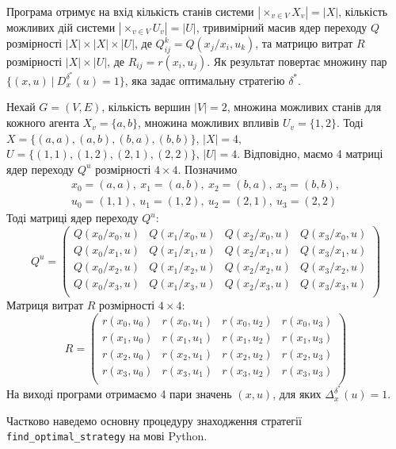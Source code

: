 \documentclass[oneside,14pt]{extarticle}
\begin{document}
Програма отримує на вхід кількість станів системи \(|\times_{v \in V} X_v| = |X|\), кількість можливих дій системи \(|\times_{v \in V}U_v| = |U|\),  тривимірний масив ядер переходу \(Q\) розмірності \(|X| \times |X| \times |U| \), де \(Q_{ij}^k = Q(x_j/x_i, u_k)\), та матрицю витрат \(R\) розмірності \(|X| \times |U|\), де \(R_{ij} = r(x_i, u_j)\). Як результат повертає множину пар \(\{(x, u)\ |\ D_x^{\delta^*}(u) = 1\}\), яка задає оптимальну стратегію \(\delta^*\).

\begin{example}
Нехай \(G = (V, E)\), кількість вершин \(|V| = 2\), множина можливих станів для кожного агента \(X_v = \{a, b\}\), множина можливих впливів \(U_v = \{1, 2\}\). Тоді \(X = \{(a, a), (a, b), (b, a), (b, b)\}\), \(|X| = 4\), \(U = \{(1, 1), (1, 2), (2, 1), (2, 2)\}\), \(|U| = 4\). Відповідно, маємо 4 матриці ядер переходу \(Q^u\) розмірності \(4 \times 4\). Позначимо
\begin{gather*}
x_0 = (a, a),\ x_1 = (a, b),\ x_2 = (b, a),\ x_3 = (b, b), \\
u_0 = (1, 1),\ u_1 = (1, 2),\ u_2 = (2, 1),\ u_3 = (2, 2)
\end{gather*}
Тоді матриці ядер переходу \(Q^u\):
\[Q^{u} = \left(\begin{matrix}
Q(x_0 / x_0, u) & Q(x_1 / x_0, u) & Q(x_2 / x_0, u) & Q(x_3 / x_0, u) \\
Q(x_0 / x_1, u) & Q(x_1 / x_1, u) & Q(x_2 / x_1, u) & Q(x_3 / x_1, u) \\
Q(x_0 / x_2, u) & Q(x_1 / x_2, u) & Q(x_2 / x_2, u) & Q(x_3 / x_2, u) \\
Q(x_0 / x_3, u) & Q(x_1 / x_3, u) & Q(x_2 / x_3, u) & Q(x_3 / x_3, u) \\
\end{matrix}\right)\]
Матриця витрат \(R\) розмірності \(4 \times 4\):
\[R = \left(\begin{matrix}
r(x_0, u_0) & r(x_0, u_1) & r(x_0, u_2) & r(x_0, u_3)\\
r(x_1, u_0) & r(x_1, u_1) & r(x_1, u_2) & r(x_1, u_3)\\
r(x_2, u_0) & r(x_2, u_1) & r(x_2, u_2) & r(x_2, u_3) \\
r(x_3, u_0) & r(x_3, u_1) & r(x_3, u_2) & r(x_3, u_3) \\
\end{matrix}\right)\]
На виході програми отримаємо 4 пари значень \((x, u)\), для яких \(\Delta_x^{\delta^*}(u) = 1\).
\end{example}

Частково наведемо основну процедуру знаходження стратегії \texttt{find\_optimal\_strategy} на мові Python.
\end{document}
